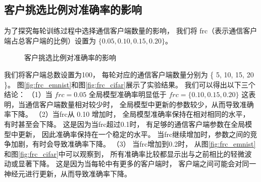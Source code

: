 \subsection{客户挑选比例对准确率的影响}
为了探究每轮训练过程中选择通信客户端数量的影响，
我们将
frc（表示通信客户端占总客户端的比例）设置为
$\{ 0.05, 0.10, 0.15, 0.20 \} $。
\begin{figure}[thbp]
    \centering
    \hfill
    \hfill
    \caption{客户挑选比例对准确率的影响}
    \label{fig:frc}
\end{figure}
我们将客户端总数设置为100，
每轮对应的通信客户端数量分别为
\{ 5, 10, 15, 20 \}。
图\ref{fig:frc_emnist}和图\ref{fig:frc_cifar}展示了实验结果。
我们可以得出以下三个结论：
（1）当
$frc=0.05$
全局模型准确率明显低于
$frc=\{ 0.10, 0.15, 0.20 \}$
这表明，当通信客户端数量相对较少时，
全局模型中更新的参数较少，从而导致准确率下降。
（2）当frc从
0.10
增加时，
全局模型准确率保持在相对相同的水平，
有时甚至会下降。
这是因为当frc超过0.1时，
有足够的通信客户端参数在全局模型中更新，
因此准确率保持在一个稳定的水平。
当frc继续增加时，参数之间的竞争加剧，有时会导致准确率下降。
（3）
当frc增加到0.2时，
从图\ref{fig:frc_emnist}和图\ref{fig:frc_cifar}中可以观察到，
所有准确率比较都显示出与之前相比的轻微波动或显著下降。
这是因为当每轮中有更多的客户端时，
客户端之间可能会对同一神经元进行更新，从而导致准确率下降。

